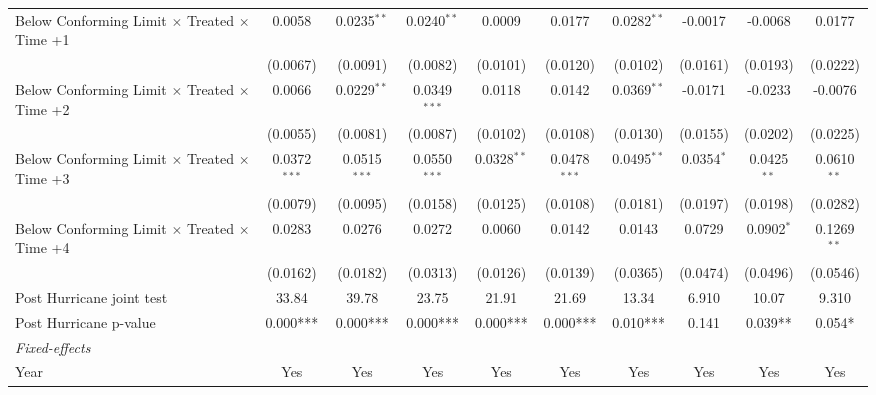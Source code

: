 \begin{tabular}{lccccccccc}
   Below Conforming Limit $\times$ Treated $\times$ Time +1   & 0.0058         & 0.0235$^{**}$  & 0.0240$^{**}$  & 0.0009        & 0.0177         & 0.0282$^{**}$ & -0.0017      & -0.0068       & 0.0177\\   
                                                              & (0.0067)       & (0.0091)       & (0.0082)       & (0.0101)      & (0.0120)       & (0.0102)      & (0.0161)     & (0.0193)      & (0.0222)\\   
   Below Conforming Limit $\times$ Treated $\times$ Time +2   & 0.0066         & 0.0229$^{**}$  & 0.0349$^{***}$ & 0.0118        & 0.0142         & 0.0369$^{**}$ & -0.0171      & -0.0233       & -0.0076\\   
                                                              & (0.0055)       & (0.0081)       & (0.0087)       & (0.0102)      & (0.0108)       & (0.0130)      & (0.0155)     & (0.0202)      & (0.0225)\\   
   Below Conforming Limit $\times$ Treated $\times$ Time +3   & 0.0372$^{***}$ & 0.0515$^{***}$ & 0.0550$^{***}$ & 0.0328$^{**}$ & 0.0478$^{***}$ & 0.0495$^{**}$ & 0.0354$^{*}$ & 0.0425$^{**}$ & 0.0610$^{**}$\\   
                                                              & (0.0079)       & (0.0095)       & (0.0158)       & (0.0125)      & (0.0108)       & (0.0181)      & (0.0197)     & (0.0198)      & (0.0282)\\   
   Below Conforming Limit $\times$ Treated $\times$ Time +4   & 0.0283         & 0.0276         & 0.0272         & 0.0060        & 0.0142         & 0.0143        & 0.0729       & 0.0902$^{*}$  & 0.1269$^{**}$\\   
                                                              & (0.0162)       & (0.0182)       & (0.0313)       & (0.0126)      & (0.0139)       & (0.0365)      & (0.0474)     & (0.0496)      & (0.0546)\\   
   Post Hurricane joint test                                  & 33.84          & 39.78          & 23.75          & 21.91         & 21.69          & 13.34         & 6.910        & 10.07         & 9.310\\  
   Post Hurricane p-value                                     & 0.000***       & 0.000***       & 0.000***       & 0.000***      & 0.000***       & 0.010***      & 0.141        & 0.039**       & 0.054*\\  
   \midrule
   \emph{Fixed-effects}\\
   Year                                                       & Yes            & Yes            & Yes            & Yes           & Yes            & Yes           & Yes          & Yes           & Yes\\  

\end{tabular}
